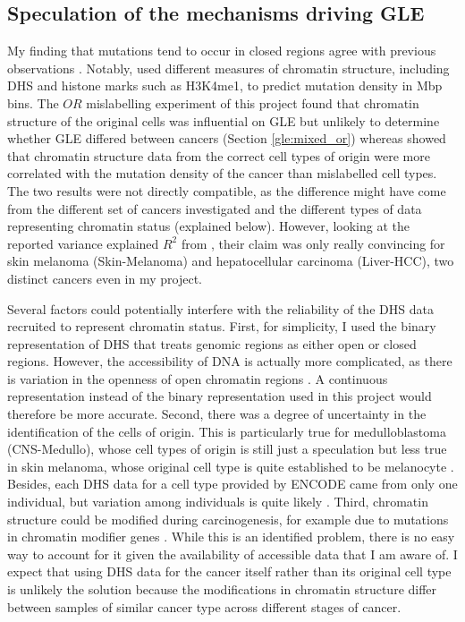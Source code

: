 \subsection{Speculation of the mechanisms driving GLE}
My finding that mutations tend to occur in closed regions agree with previous observations \citep{Polak2015,Fujimoto2016Whole-genomeCancer,Prendergast2007ChromatinGenome}. Notably, \citet{Polak2015} used different measures of chromatin structure, including DHS and histone marks such as H3K4me1, to predict mutation density in Mbp bins. The $OR$ mislabelling experiment of this project found that chromatin structure of the original cells was influential on GLE but unlikely to determine whether GLE differed between cancers (Section \ref{gle:mixed_or}) whereas \citet{Polak2015} showed that chromatin structure data from the correct cell types of origin were more correlated with the mutation density of the cancer than mislabelled cell types. The two results were not directly compatible, as the difference might have come from the different set of cancers investigated and the different types of data representing chromatin status (explained below). However, looking at the reported variance explained $R^2$ from \citet{Polak2015}, their claim was only really convincing for skin melanoma (Skin-Melanoma) and hepatocellular carcinoma (Liver-HCC), two distinct cancers even in my project. 

Several factors could potentially interfere with the reliability of the DHS data recruited to represent chromatin status. First, for simplicity, I used the binary representation of DHS that treats genomic regions as either open or closed regions. However, the accessibility of DNA is actually more complicated, as there is variation in the openness of open chromatin regions \citep{Boyle2008High-ResolutionGenome}. A continuous representation instead of the binary representation used in this project would therefore be more accurate. Second, there was a degree of uncertainty in the identification of the cells of origin. This is particularly true for medulloblastoma (CNS-Medullo), whose cell types of origin is still just a speculation \citep{Penas2015TheMedulloblastoma} but less true in skin melanoma, whose original cell type is quite established to be melanocyte \citep{Lin2007MelanocytePigmentation}. Besides, each DHS data for a cell type provided by ENCODE came from only one individual, but variation among individuals is quite likely \citep{Thurman2012TheGenome}. Third, chromatin structure could be modified during carcinogenesis, for example due to mutations in chromatin modifier genes \citep{Makova2015TheGenome}. While this is an identified problem, there is no easy way to account for it given the availability of accessible data that I am aware of. I expect that using DHS data for the cancer itself rather than its original cell type is unlikely the solution because the modifications in chromatin structure differ between samples of similar cancer type across different stages of cancer. 

